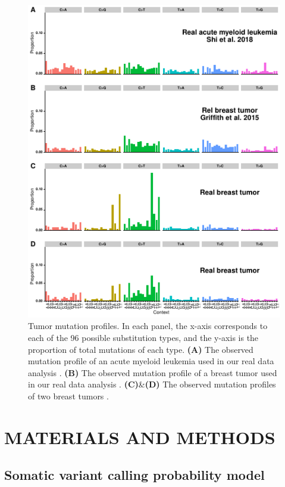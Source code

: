 \documentclass[a4,center,fleqn]{NAR}
\begin{document}
\begin{figure}
  \begin{center}
  \includegraphics{figures/real_signatures_only.pdf}
  \end{center}
  \caption{Tumor mutation profiles.
  In each panel, the x-axis corresponds to each of the 96 possible substitution types, and the y-axis is the proportion of total mutations of each type.
  \textbf{(A)} The observed mutation profile of an acute myeloid leukemia used in our real data analysis \cite{Griffith2015}.
  \textbf{(B)} The observed mutation profile of a breast tumor used in our real data analysis \cite{Shi2018}.
  \textbf{(C)}\&\textbf{(D)} The observed mutation profiles of two breast tumors \cite{Alexandrov2019}.
   }
  \label{NAR-realsigfig}
 \end{figure}

\section{MATERIALS AND METHODS}
\subsection{Somatic variant calling probability model}
\end{document}
